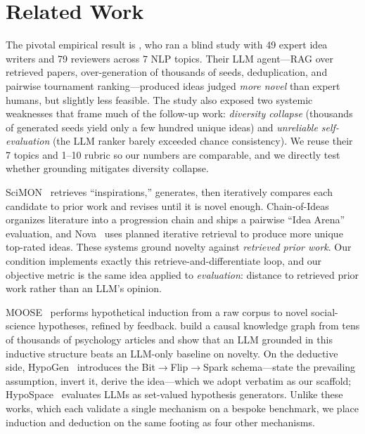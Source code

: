 \section{Related Work}
\label{sec:related}

 The pivotal empirical result is \citet{si2024can}, who ran a blind study with 49 expert idea writers and 79 reviewers across 7 NLP topics. Their LLM agent---RAG over retrieved papers, over-generation of thousands of seeds, deduplication, and pairwise tournament ranking---produced ideas judged \emph{more novel} than expert humans, but slightly less feasible. The study also exposed two systemic weaknesses that frame much of the follow-up work: \emph{diversity collapse} (thousands of generated seeds yield only a few hundred unique ideas) and \emph{unreliable self-evaluation} (the LLM ranker barely exceeded chance consistency). We reuse their 7 topics and 1--10 rubric so our numbers are comparable, and we directly test whether grounding mitigates diversity collapse.

 SciMON~\citep{wang2023scimon} retrieves ``inspirations,'' generates, then iteratively compares each candidate to prior work and revises until it is novel enough. Chain-of-Ideas~\citep{li2024chain} organizes literature into a progression chain and ships a pairwise ``Idea Arena'' evaluation, and Nova~\citep{nova2024} uses planned iterative retrieval to produce more unique top-rated ideas. These systems ground novelty against \emph{retrieved prior work}. Our \litcomp condition implements exactly this retrieve-and-differentiate loop, and our objective \lgn metric is the same idea applied to \emph{evaluation}: distance to retrieved prior work rather than an LLM's opinion.

 MOOSE~\citep{yang2023moose} performs hypothetical induction from a raw corpus to novel social-science hypotheses, refined by feedback. \citet{causalgraph2024} build a causal knowledge graph from tens of thousands of psychology articles and show that an LLM grounded in this inductive structure beats an LLM-only baseline on novelty. On the deductive side, HypoGen~\citep{hypogen2025} introduces the Bit$\rightarrow$Flip$\rightarrow$Spark schema---state the prevailing assumption, invert it, derive the idea---which we adopt verbatim as our \deduction scaffold; HypoSpace~\citep{hypospace2025} evaluates LLMs as set-valued hypothesis generators. Unlike these works, which each validate a single mechanism on a bespoke benchmark, we place induction and deduction on the same footing as four other mechanisms.

